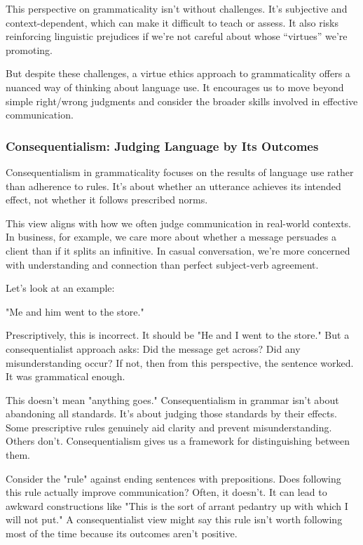 This perspective on grammaticality isn't without challenges. It's subjective and context-dependent, which can make it difficult to teach or assess. It also risks reinforcing linguistic prejudices if we're not careful about whose ``virtues'' we're promoting.

But despite these challenges, a virtue ethics approach to grammaticality offers a nuanced way of thinking about language use. It encourages us to move beyond simple right/wrong judgments and consider the broader skills involved in effective communication.

\subsubsection{Consequentialism: Judging Language by Its Outcomes}

Consequentialism in grammaticality focuses on the results of language use rather than adherence to rules. It's about whether an utterance achieves its intended effect, not whether it follows prescribed norms.

This view aligns with how we often judge communication in real-world contexts. In business, for example, we care more about whether a message persuades a client than if it splits an infinitive. In casual conversation, we're more concerned with understanding and connection than perfect subject-verb agreement.

Let's look at an example:

"Me and him went to the store."

Prescriptively, this is incorrect. It should be "He and I went to the store." But a consequentialist approach asks: Did the message get across? Did any misunderstanding occur? If not, then from this perspective, the sentence worked. It was grammatical enough.

This doesn't mean "anything goes." Consequentialism in grammar isn't about abandoning all standards. It's about judging those standards by their effects. Some prescriptive rules genuinely aid clarity and prevent misunderstanding. Others don't. Consequentialism gives us a framework for distinguishing between them.

Consider the "rule" against ending sentences with prepositions. Does following this rule actually improve communication? Often, it doesn't. It can lead to awkward constructions like "This is the sort of arrant pedantry up with which I will not put." A consequentialist view might say this rule isn't worth following most of the time because its outcomes aren't positive.

